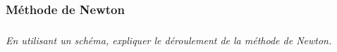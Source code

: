 \documentclass[10pt]{article}
\begin{document}
\subsubsection{Méthode de Newton}





\subparagraph{}
\textit{En utilisant un schéma, expliquer le déroulement de la méthode de Newton.}
\end{document}

